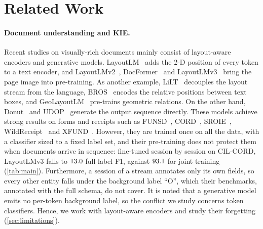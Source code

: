 \documentclass[10pt,twocolumn,letterpaper]{article}
\begin{document}
\section{Related Work}
\label{sec:related}
\paragraph{Document understanding and KIE.} Recent studies on visually-rich documents mainly consist of layout-aware encoders and generative models. LayoutLM~\citep{xu2020layoutlm} adds the 2-D position of every token to a text encoder, and LayoutLMv2~\citep{xu2021layoutlmv2}, DocFormer~\citep{appalaraju2021docformer} and LayoutLMv3~\citep{huang2022layoutlmv3} bring the page image into pre-training. As another example, LiLT~\citep{wang2022lilt} decouples the layout stream from the language, BROS~\citep{hong2022bros} encodes the relative positions between text boxes, and GeoLayoutLM~\citep{luo2023geolayoutlm} pre-trains geometric relations. On the other hand, Donut~\citep{kim2022donut} and UDOP~\citep{tang2023udop} generate the output sequence directly. These models achieve strong results on forms and receipts such as FUNSD~\citep{jaume2019funsd}, CORD~\citep{park2019cord}, SROIE~\citep{huang2019sroie}, WildReceipt~\citep{sun2021sdmgr} and XFUND~\citep{xu2022xfund}. However, they are trained once on all the data, with a classifier sized to a fixed label set, and their pre-training does not protect them when documents arrive in sequence: fine-tuned session by session on CIL-CORD, LayoutLMv3 falls to $13.0$ full-label F1, against $93.1$ for joint training (\cref{tab:main}). Furthermore, a session of a stream annotates only its own fields, so every other entity falls under the background label ``O'', which their benchmarks, annotated with the full schema, do not cover. It is noted that a generative model emits no per-token background label, so the conflict we study concerns token classifiers. Hence, we work with layout-aware encoders and study their forgetting (\cref{sec:limitations}).
\end{document}
